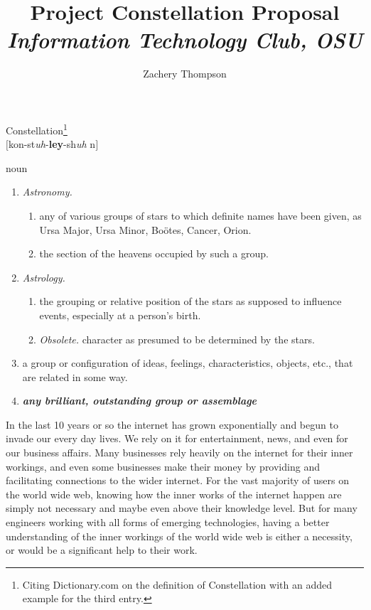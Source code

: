 \documentclass[12pt]{article}
\title{
\textbf{Project Constellation Proposal}
\\
\textit{Information Technology Club, OSU}
}
\author{Zachery Thompson}
\begin{document}
\maketitle{}
\clearpage{}

\begin{center}
\LARGE{Constellation}\footnote{Citing Dictionary.com on the definition of Constellation with an added example for the third entry.}
\\
\large{$[$kon-st\textit{uh}-\textbf{ley}-sh\textit{uh} n$]$}
\\
\end{center}
noun
\begin{enumerate}
	\item \textit{Astronomy.}
	\begin{enumerate}
		\item any of various groups of stars to which definite names have been given, as Ursa Major, Ursa Minor, Bo\"{o}tes, Cancer, Orion.
		\item the section of the heavens occupied by such a group.
	\end{enumerate}
	\item \textit{Astrology.}
	\begin{enumerate}
		\item the grouping or relative position of the stars as supposed to influence events, especially at a person's birth.
		\item \textit{Obsolete.} character as presumed to be determined by the stars.
	\end{enumerate}
	\item a group or configuration of ideas, feelings, characteristics, objects, etc., that are related in some way.
	\item \textbf{\textit{any brilliant, outstanding group or assemblage}}
\end{enumerate}
\clearpage{}

In the last 10 years or so the internet has grown exponentially and begun to invade our every day lives. 
We rely on it for entertainment, news, and even for our business affairs. Many businesses
rely heavily on the internet for their inner workings, and even some businesses make their money by providing
and facilitating connections to the wider internet. For the vast majority of users on the world wide web, 
knowing how the inner works of the internet happen are simply not necessary and maybe even above their
knowledge level. But for many engineers working with all forms of emerging technologies, having a better
understanding of the inner workings of the world wide web is either a necessity, or would be a significant help
to their work.  
\\
\end{document}
